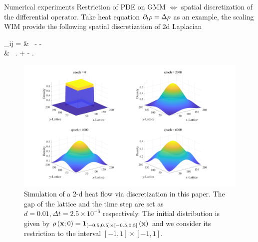 \documentclass{beamer}
\begin{document}
\begin{frame}{Numerical experiments}
\scriptsize
	Restriction of PDE on GMM $\Longleftrightarrow$ spatial discretization of the differential operator.
	Take heat equation $\partial_t \rho = \Delta \rho$ as an example, the scaling WIM provide the following spatial discretization of 2d Laplacian
	\bequn
	\begin{aligned}
	_{ij} = & \ -  \lp {}\log {} - \log {} \rpt			\\
	& \ \left. \qquad + \log {} - \log {} \rp.
	\end{aligned}
\eequn
\begin{figure}[h]
  \centering
  \centerline{\includegraphics[width=0.7\linewidth]{Heat_flow_2d.jpg}}
  \caption{\scriptsize{Simulation of a 2-d heat flow via discretization in this paper. The gap of the lattice and the time step are set as $d = 0.01, \Delta t = 2.5 \times 10^{-6}$ respectively. The initial distribution is given by $\rho\left( \mathbf{x}; 0 \right) = \mathbf{1}_{[-0.5, 0.5] \times [-0.5, 0.5]}\left( \mathbf{x} \right)$ and we consider its restriction to the interval $[-1, 1] \times [-1, 1]$.}}
\end{figure}
\end{frame}
\end{document}
